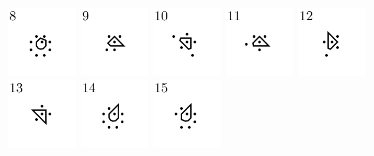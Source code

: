 \documentclass[text.tex]{subfiles}
\begin{document}
\begin{figure}[h!]
\includegraphics[width=0.16\textwidth]{img/results/circle8_concat/circle8_100000_(1_0alpha_1)_008.pdf}
\includegraphics[width=0.16\textwidth]{img/results/circle8_concat/circle8_100000_(1_0alpha_1)_009.pdf}
\includegraphics[width=0.16\textwidth]{img/results/circle8_concat/circle8_100000_(1_0alpha_1)_010.pdf}
\includegraphics[width=0.16\textwidth]{img/results/circle8_concat/circle8_100000_(1_0alpha_1)_011.pdf}
\includegraphics[width=0.16\textwidth]{img/results/circle8_concat/circle8_100000_(1_0alpha_1)_012.pdf}
\includegraphics[width=0.16\textwidth]{img/results/circle8_concat/circle8_100000_(1_0alpha_1)_013.pdf}
\includegraphics[width=0.16\textwidth]{img/results/circle8_concat/circle8_100000_(1_0alpha_1)_014.pdf}
\includegraphics[width=0.16\textwidth]{img/results/circle8_concat/circle8_100000_(1_0alpha_1)_015.pdf}

\end{figure}
\end{document}
